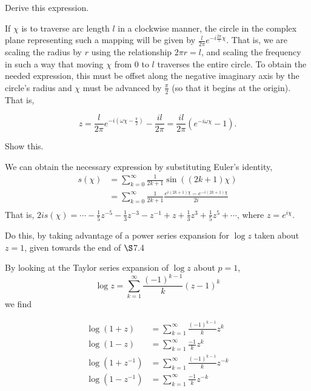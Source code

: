 \documentclass[../the-road-to-reality.tex]{subfiles}
\begin{document}
\begin{questions}
\question Derive this expression.

\begin{solution}
	If $\chi$ is to traverse arc length $l$ in a clockwise manner, the circle in the complex plane representing such a mapping will be given by $\frac{l}{2\pi}e^{-i\frac{2\pi}{l}\chi}$. That is, we are scaling the radius by $r$ using the relationship $2\pi{r} = l$, and scaling the frequency in such a way that moving $\chi$ from $0$ to $l$ traverses the entire circle. To obtain the needed expression, this must be offset along the negative imaginary axis by the circle's radius and $\chi$ must be advanced by $\frac{\pi}{2}$ (so that it begins at the origin). That is,

	\[
	z=\frac{l}{2\pi}e^{-i(\omega\chi - \frac{\pi}{2})} - \frac{il}{2\pi} = \frac{il}{2\pi}(e^{-i\omega\chi} - 1)
	.\] 
\end{solution}

\question Show this.

\begin{solution}
	We can obtain the necessary expression by substituting Euler's identity,
	\begin{align*}
		s(\chi) &= \sum_{k=0}^{\infty}\frac{1}{2k+1}\sin((2k+1)\chi) \\
		&= \sum_{k=0}^{\infty}\frac{1}{2k+1}\frac{e^{i(2k+1)\chi} - e^{-i(2k+1)\chi}}{2i} \\
	\end{align*}
	That is, $2is(\chi) = \cdots - \frac{1}{5}z^{-5} - \frac{1}{3}z^{-3} - z^{-1} + z + \frac{1}{3}z^3 + \frac{1}{5}z^5 + \cdots$, where $z = e^{i\chi}$.
\end{solution}

\question Do this, by taking advantage of a power series expansion for $\log{z}$ taken about $z=1$, given towards the end of $\S$7.4

\begin{solution}
	By looking at the Taylor series expansion of $\log{z}$ about $p = 1$, $$\log{z} = \sum_{k=1}^{\infty}\frac{(-1)^{k-1}}{k}(z-1)^k$$we find

	\begin{align*}
		\log(1+z) &= \sum_{k=1}^{\infty}\frac{(-1)^{k-1}}{k}z^k \\
		\log(1-z) &= \sum_{k=1}^{\infty}\frac{-1}{k}z^k \\
		\log(1+z^{-1}) &= \sum_{k=1}^{\infty}\frac{(-1)^{k-1}}{k}z^{-k} \\
		\log(1-z^{-1}) &= \sum_{k=1}^{\infty}\frac{-1}{k}z^{-k} \\
	\end{align*}


\end{solution}
\end{questions}
\end{document}
